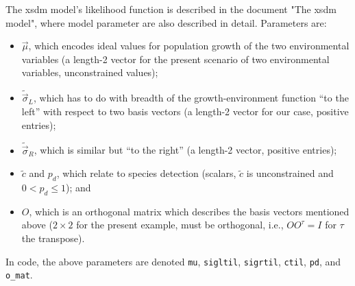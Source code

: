 \documentclass[11pt]{article}\usepackage[]{graphicx}\usepackage[]{xcolor}
\begin{document}
The xsdm model's likelihood function is described in the document "The xsdm model",
where model parameter are also described in detail. Parameters are:
\begin{itemize}
\item $\vec{\mu}$, which encodes ideal values for population growth 
of the two environmental variables (a length-2 vector for the present 
scenario of two environmental variables, unconstrained values); 
\item $\tilde{\vec{\sigma}}_L$, which has to do with breadth of the growth-environment
function ``to the left'' with respect to two basis vectors (a length-2 vector for our case,
positive entries);
\item $\tilde{\vec{\sigma}}_R$, which is similar but ``to the right'' (a length-2 vector,
positive entries);
\item $\tilde{c}$ and $p_d$, which relate to species detection (scalars, $\tilde{c}$ is 
unconstrained and $0<p_d\leq 1$); and
\item $O$, which is an orthogonal matrix which 
describes the basis vectors mentioned above ($2 \times 2$ for the present example, must be
orthogonal, i.e., $OO^{\tau}=I$ for $\tau$ the transpose).
\end{itemize}
In code, the above parameters are denoted \texttt{mu}, \texttt{sigltil}, \texttt{sigrtil},
\texttt{ctil}, \texttt{pd}, and \texttt{o\_mat}.
\end{document}
